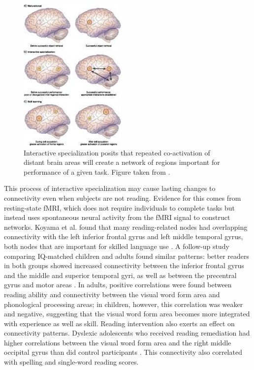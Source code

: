 \begin{figure}[h!]
\centering
\includegraphics[height=3in]{images/ch1-interactive-specialization.jpg}
    \caption[Interactive specialization explains changes in activity.]{Interactive specialization posits that repeated co-activation of distant brain areas will create a network of regions important for performance of a given task. Figure taken from \citep{Gaffrey2012}.}
\label{fig:ch1-interactive-specialization}
\end{figure}

This process of interactive specialization may cause lasting changes to connectivity even when subjects are not reading. Evidence for this comes from resting-state fMRI, which does not require individuals to complete tasks but instead uses spontaneous neural activity from the fMRI signal to construct networks. Koyama et al. found that many reading-related nodes had overlapping connectivity with the left inferior frontal gyrus and left middle temporal gyrus, both nodes that are important for skilled language use \citep{Koyama2010}. A follow-up study comparing IQ-matched children and adults found similar patterns: better readers in both groups showed increased connectivity between the inferior frontal gyrus and the middle and superior temporal gyri, as well as between the precentral gyrus and motor areas \citep{Koyama2011}. In adults, positive correlations were found between reading ability and connectivity between the visual word form area and phonological processing areas; in children, however, this correlation was weaker and negative, suggesting that the visual word form area becomes more integrated with experience as well as skill. Reading intervention also exerts an effect on connectivity patterns. Dyslexic adolescents who received reading remediation had higher correlations between the visual word form area and the right middle occipital gyrus than did control participants \citep{Koyama2013}. This connectivity also correlated with spelling and single-word reading scores.

